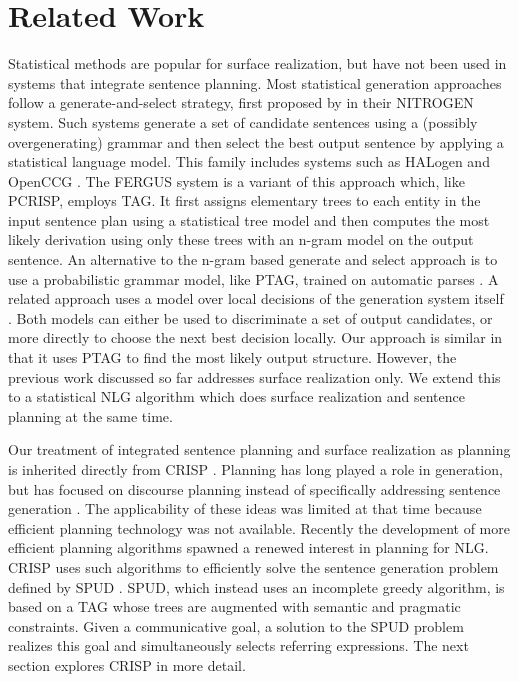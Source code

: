 \section{Related Work}
\label{sec:related}

Statistical methods are popular for surface realization, but have not been used in systems that integrate sentence planning. Most statistical generation approaches follow a generate-and-select strategy, first proposed by  in their NITROGEN system. Such systems generate a set of candidate sentences using a (possibly overgenerating) grammar and then select the best output sentence by applying a statistical language model. This family includes systems such as HALogen \cite{langkildeknight1998,langkilde2000} and OpenCCG \cite{whitebaldridge2003}.  The FERGUS system \cite{bangalorerambow2000} is a variant of this approach which, like PCRISP, employs TAG. It first assigns elementary trees to each entity in the input sentence plan using a statistical tree model and then computes the most likely derivation using only these trees with an n-gram model on the output sentence. An alternative to the n-gram based generate and select approach is to use a probabilistic grammar model, like PTAG, trained on automatic parses \cite{zhongstent2005}. A related approach uses a model over local decisions of the generation system itself \cite{belz2008}. Both models can either be used to discriminate a set of output candidates, or more directly to choose the next best decision locally. Our approach is similar in that it uses PTAG to find the most likely output structure. However, the previous work discussed so far addresses surface realization only. We extend this to a statistical NLG algorithm which does surface realization and sentence planning at the same time.

Our treatment of integrated sentence planning and surface realization as planning is inherited directly from CRISP \cite{kollerstone2007}.  Planning has long played a role in generation, but has focused on discourse planning instead of specifically addressing sentence generation \cite{hovy1988,appelt1992}. The applicability of these ideas was limited at that time because efficient planning technology was not available. Recently the development of more efficient planning algorithms \cite{hoffmannnebel2001} spawned a renewed interest in planning for NLG. CRISP uses such algorithms to efficiently solve the sentence generation problem defined by SPUD \cite{Stone2003a}. SPUD, which instead uses an incomplete greedy algorithm, is based on a TAG  whose trees are augmented with semantic and pragmatic constraints. Given a communicative goal, a solution to the SPUD problem realizes this goal and simultaneously selects referring expressions. The next section explores CRISP in more detail.





